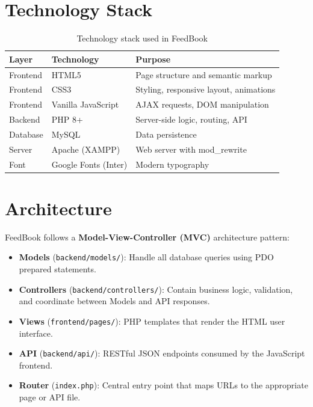 \documentclass[12pt,a4paper]{report}
\begin{document}
\section{Technology Stack}

\begin{table}[h]
\centering
\begin{tabular}{l l l}
\toprule
\textbf{Layer} & \textbf{Technology} & \textbf{Purpose} \\
\midrule
Frontend & HTML5 & Page structure and semantic markup \\
Frontend & CSS3 & Styling, responsive layout, animations \\
Frontend & Vanilla JavaScript & AJAX requests, DOM manipulation \\
Backend & PHP 8+ & Server-side logic, routing, API \\
Database & MySQL & Data persistence \\
Server & Apache (XAMPP) & Web server with mod\_rewrite \\
Font & Google Fonts (Inter) & Modern typography \\
\bottomrule
\end{tabular}
\caption{Technology stack used in FeedBook}
\end{table}

\section{Architecture}
FeedBook follows a \textbf{Model-View-Controller (MVC)} architecture pattern:

\begin{itemize}
    \item \textbf{Models} (\texttt{backend/models/}): Handle all database queries using PDO prepared statements.
    \item \textbf{Controllers} (\texttt{backend/controllers/}): Contain business logic, validation, and coordinate between Models and API responses.
    \item \textbf{Views} (\texttt{frontend/pages/}): PHP templates that render the HTML user interface.
    \item \textbf{API} (\texttt{backend/api/}): RESTful JSON endpoints consumed by the JavaScript frontend.
    \item \textbf{Router} (\texttt{index.php}): Central entry point that maps URLs to the appropriate page or API file.
\end{itemize}
\end{document}
